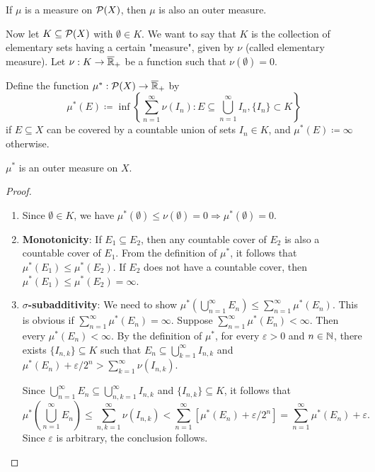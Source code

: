 \begin{remark}
If $\mu$ is a measure on $\mathcal{P}(X)$, then $\mu$ is also an outer measure.
\end{remark}

Now let $K \subseteq \mathcal{P}(X)$ with $\emptyset \in K$. We want to say that $K$ is the collection of elementary sets having a certain "measure", given by $\nu$ (called elementary measure).
Let $\nu: K \to \overline{\mathbb{R}}_+$ be a function such that $\nu(\emptyset) = 0$.

Define the function $\mu^*: \mathcal{P}(X) \to \overline{\mathbb{R}}_+$ by
\[
\mu^*(E) \coloneqq \inf\left\{\sum_{n=1}^{\infty} \nu(I_n) : E \subseteq \bigcup_{n=1}^{\infty} I_n, \{I_n\} \subset K\right\}
\]
if $E \subseteq X$ can be covered by a countable union of sets $I_n \in K$, and $\mu^*(E) \coloneqq \infty$ otherwise.

\begin{theorem}
$\mu^*$ is an outer measure on $X$.
\end{theorem}

\begin{proof}
\begin{enumerate}
    \item Since $\emptyset \in K$, we have $\mu^*(\emptyset) \leq \nu(\emptyset) = 0 \Rightarrow \mu^*(\emptyset) = 0$.

    \item \textbf{Monotonicity}: If $E_1 \subseteq E_2$, then any countable cover of $E_2$ is also a countable cover of $E_1$. From the definition of $\mu^*$, it follows that $\mu^*(E_1) \leq \mu^*(E_2)$.
    If $E_2$ does not have a countable cover, then $\mu^*(E_1) \leq \mu^*(E_2) = \infty$.

    \item \textbf{$\sigma$-subadditivity}: We need to show $\mu^*\left(\bigcup_{n=1}^{\infty} E_n\right) \leq \sum_{n=1}^{\infty} \mu^*(E_n)$.
    This is obvious if $\sum_{n=1}^{\infty} \mu^*(E_n) = \infty$.
    Suppose $\sum_{n=1}^{\infty} \mu^*(E_n) < \infty$. Then every $\mu^*(E_n) < \infty$.
    By the definition of $\mu^*$, for every $\varepsilon > 0$ and $n \in \mathbb{N}$, there exists $\{I_{n,k}\} \subseteq K$ such that
    $E_n \subseteq \bigcup_{k=1}^{\infty} I_{n,k}$ and $\mu^*(E_n) + \varepsilon/2^n > \sum_{k=1}^{\infty} \nu(I_{n,k})$.

    Since $\bigcup_{n=1}^{\infty} E_n \subseteq \bigcup_{n,k=1}^{\infty} I_{n,k}$ and $\{I_{n,k}\} \subseteq K$, it follows that
    \[
    \mu^*\left(\bigcup_{n=1}^{\infty} E_n\right) \leq \sum_{n,k=1}^{\infty} \nu(I_{n,k}) < \sum_{n=1}^{\infty} [\mu^*(E_n) + \varepsilon/2^n] = \sum_{n=1}^{\infty} \mu^*(E_n) + \varepsilon.
    \]
    Since $\varepsilon$ is arbitrary, the conclusion follows.
\end{enumerate}
\end{proof}

